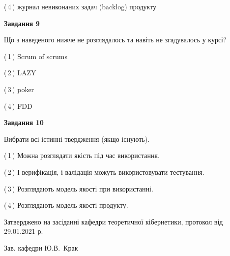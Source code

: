 \documentclass[10pt, ukrainian]{article}
\begin{document}
{\begin {large}
(\,4\,) журнал невиконаних задач (backlog) продукту%


{\begin {center}\textbf{Завдання 9}\end {center}}\par
Що з наведеного нижче не розглядалось та навіть не згадувалось у курсі?\par
\vspace{2mm}



(\,1\,) Scrum of scrums%



(\,2\,) LAZY%



(\,3\,) poker%



(\,4\,) FDD%


{\begin {center}\textbf{Завдання 10}\end {center}}\par
Вибрати всі істинні твердження (якщо існують).\par
\vspace{2mm}



(\,1\,) Можна розглядати якість під час використання.%



(\,2\,) І верифікація, і валідація можуть використовувати тестування.%



(\,3\,) Розглядають модель якості при використанні.%



(\,4\,) Розглядають модель якості продукту.%



\end {large}}
{\vspace{5mm}\smallskip \begin {small} Затверджено на засіданні кафедри теоретичної кібернетики, протокол  від   29.01.2021 р.\par\smallskip\smallskip
{\parbox {6.5 cm}{Зав. кафедри \dotfill Ю.В.~Крак}} \end{small}}
\newpage
\end{document}
